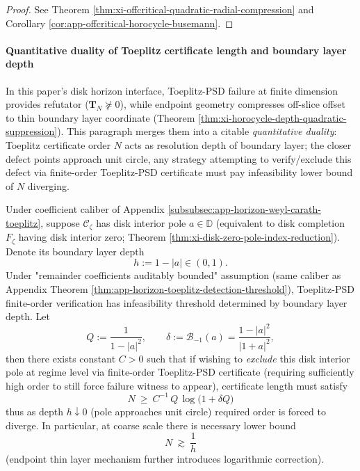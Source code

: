 \begin{proof}
See Theorem \ref{thm:xi-offcritical-quadratic-radial-compression} and Corollary \ref{cor:app-offcritical-horocycle-busemann}.
\end{proof}

\paragraph{Quantitative duality of Toeplitz certificate length and boundary layer depth}
In this paper's disk horizon interface, Toeplitz-PSD failure at finite dimension provides refutator (\(\mathbf{T}_N\nsucceq 0\)), while endpoint geometry compresses off-slice offset to thin boundary layer coordinate (Theorem \ref{thm:xi-horocycle-depth-quadratic-suppression}).
This paragraph merges them into a citable \emph{quantitative duality}: Toeplitz certificate order \(N\) acts as resolution depth of boundary layer; the closer defect points approach unit circle, any strategy attempting to verify/exclude this defect via finite-order Toeplitz-PSD certificate must pay infeasibility lower bound of \(N\) diverging.

\begin{theorem}\label{thm:xi-toeplitz-length-vs-boundary-depth}
Under coefficient caliber of Appendix \ref{subsubsec:app-horizon-weyl-carath-toeplitz}, suppose \(\mathscr{C}_{\zeta}\) has disk interior pole \(a\in\mathbb{D}\) (equivalent to disk completion \(F_{\zeta}\) having disk interior zero; Theorem \ref{thm:xi-disk-zero-pole-index-reduction}).
Denote its boundary layer depth
\[
h:=1-|a|\in(0,1).
\]
Under "remainder coefficients auditably bounded" assumption (same caliber as Appendix Theorem \ref{thm:app-horizon-toeplitz-detection-threshold}), Toeplitz-PSD finite-order verification has infeasibility threshold determined by boundary layer depth.
Let
\[
Q:=\frac{1}{1-|a|^2},\qquad
\delta:=\mathcal{B}_{-1}(a)=\frac{1-|a|^2}{|1+a|^2},
\]
then there exists constant \(C>0\) such that if wishing to \emph{exclude} this disk interior pole at regime level via finite-order Toeplitz-PSD certificate (requiring sufficiently high order to still force failure witness to appear), certificate length must satisfy
\[
\boxed{\;
N\ \ge\ C^{-1}\,Q\,\log\!\bigl(1+\delta Q\bigr)\;}
\]
thus as depth \(h\downarrow 0\) (pole approaches unit circle) required order is forced to diverge.
In particular, at coarse scale there is necessary lower bound
\[
\boxed{\;
N\ \gtrsim\ \frac{1}{h}\;}
\]
(endpoint thin layer mechanism further introduces logarithmic correction).
\end{theorem}

